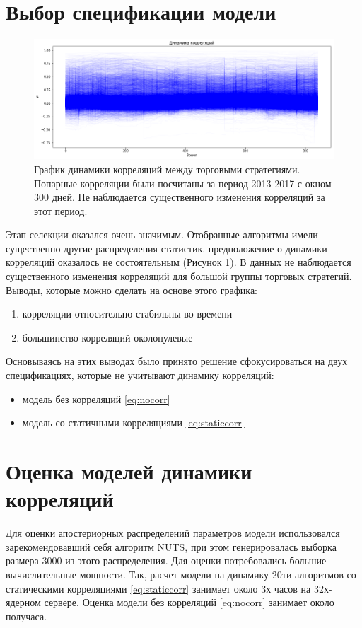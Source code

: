 \section{Выбор спецификации модели}
\begin{figure}[t]
	\centering
	\includegraphics[width=\linewidth]{Thesis/images/correlations}
	\caption{График динамики корреляций между торговыми стратегиями. Попарные корреляции были посчитаны за период 2013-2017 с окном 300 дней. Не наблюдается существенного изменения корреляций за этот период.}
	\label{fig:correlations}
\end{figure}
Этап селекции оказался очень значимым. Отобранные алгоритмы имели существенно другие распределения статистик. предположение о динамики корреляций оказалось не состоятельным (Рисунок \ref{fig:correlations}). В данных не наблюдается существенного изменения корреляций для большой группы торговых стратегий. Выводы, которые можно сделать на основе этого графика:
\begin{enumerate}
	\item корреляции относительно стабильны во времени
	\item большинство корреляций околонулевые
\end{enumerate}

Основываясь на этих выводах было принято решение сфокусироваться на двух спецификациях, которые не учитывают динамику корреляций:
\begin{itemize}
	\item модель без корреляций \eqref{eq:nocorr}
	\item модель со статичными корреляциями \eqref{eq:staticcorr}
\end{itemize}
\section{Оценка моделей динамики корреляций}
Для оценки апостериорных распределений параметров модели использовался зарекомендовавший себя алгоритм NUTS, при этом генерировалась выборка размера 3000 из этого распределения. Для оценки потребовались большие вычислительные мощности. Так, расчет модели на динамику 20ти алгоритмов со статическими корреляциями \eqref{eq:staticcorr} занимает около 3х часов на 32х-ядерном сервере. Оценка модели без корреляций \eqref{eq:nocorr} занимает около получаса. 

